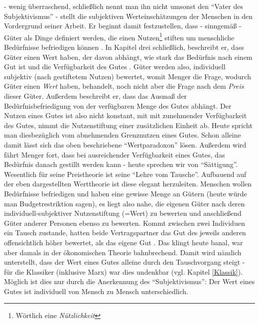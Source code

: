 \textcite{Menger1871} - wenig überraschend, schließlich nennt man ihn nicht umsonst den "`Vater des Subjektivismus"' - stellt die subjektiven Werteinschätzungen der Menschen in den Vordergrund seiner Arbeit. Er beginnt damit festzustellen, dass - sinngemäß -  Güter als Dinge definiert werden, die einen Nutzen\footnote{Wörtlich eine \textit{Nützlichkeit}} stiften um menschliche Bedürfnisse befriedigen können \parencite[S. 1f]{Menger1871}. In Kapitel drei schließlich, beschreibt er, dass Güter einen Wert haben, der davon abhängt, wie stark das Bedürfnis nach einem Gut ist und die Verfügbarkeit des Gutes \parencite[S. 78]{Menger1871}. Güter werden also, individuell subjektiv (nach gestiftetem Nutzen) bewertet, womit Menger die Frage, wodurch Güter einen \textit{Wert} haben, behandelt, noch nicht aber die Frage nach dem \textit{Preis} dieser Güter. Außerdem beschreibt er, dass das Ausmaß der Bedürfnisbefriedigung von der verfügbaren Menge des Gutes abhängt. Der Nutzen eines Gutes ist also nicht konstant, mit mit zunehmender Verfügbarkeit des Gutes, nimmt die Nutzenstiftung einer zusätzlichen Einheit ab. Heute spricht man diesbezüglich vom abnehmenden Grenznutzen eines Gutes. Schon alleine damit lässt sich das oben beschriebene "`Wertparadoxon"' lösen. Außerdem wird fährt Menger fort, dass bei ausreichender Verfügbarkeit eines Gutes, das Bedürfnis danach gestillt werden kann - heute sprechen wir von "`Sättigung"'. 
Wesentlich für seine Preistheorie ist seine "`Lehre vom Tausche"'. Aufbauend auf der eben dargestellten Werttheorie ist diese elegant herzuleiten. Menschen wollen Bedürfnisse befriedigen und haben eine gewisse Menge an Gütern (heute würde man Budgetrestriktion sagen), es liegt also nahe, die eigenen Güter nach deren individuell-subjektiver Nutzenstiftung (=Wert) zu bewerten und anschließend Güter anderer Personen ebenso zu bewerten. Kommt zwischen zwei Individuen ein Tausch zustande, hatten beide Vertragspartner das Gut des jeweils anderen offensichtlich höher bewertet, als das eigene Gut \parencite[S. 156]{Menger1871}. Das klingt heute banal, war aber damals in der ökonomischen Theorie bahnbrechend. Damit wird nämlich unterstellt, dass der Wert eines Gutes alleine durch den Tauschvorgang steigt - für die Klassiker (inklusive Marx) war dies undenkbar (vgl. Kapitel \ref{Klassik}). Möglich ist dies nur durch die Anerkennung des "`Subjektivismus"': Der Wert eines Gutes ist individuell von Mensch zu Mensch unterschiedlich.
